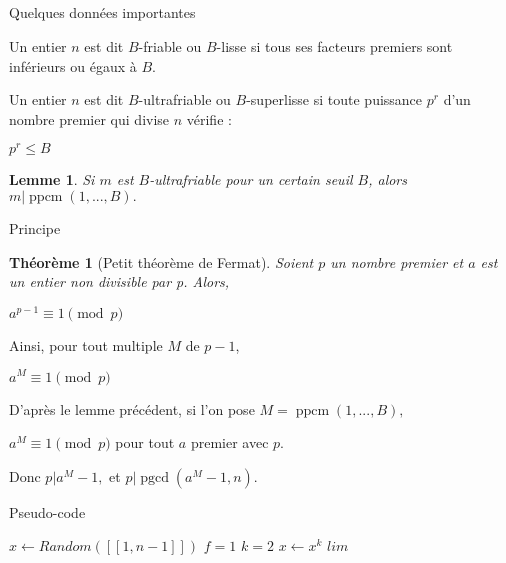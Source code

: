 \documentclass[utf8,10pt,french]{beamer}
\newtheorem{theoreme}{Th{\'e}or{\`e}me}
\newtheorem{lemme}{Lemme}
\DeclareMathOperator{\pgcd}{pgcd}
\DeclareMathOperator{\ppcm}{ppcm}
\begin{document}
\subsection{}
\begin{frame}{Quelques données importantes}
\begin{definition}
Un entier $n$ est dit $B$-friable ou $B$-lisse si tous ses facteurs premiers sont inférieurs ou égaux à $B.$
\end{definition} \pause

\begin{definition}
Un entier $n$ est dit $B$-ultrafriable ou $B$-superlisse si toute puissance $p^r$ d’un nombre premier qui divise $n$ vérifie :
\begin{center}
$p^r \leq B$
\end{center}
\end{definition} \pause

\begin{lemme}
Si $m$ est $B$-ultrafriable pour un certain seuil $B$, alors $m | \ppcm(1, ..., B).$
\end{lemme}
\end{frame}

\begin{frame}{Principe}
\begin{theoreme}[Petit théorème de Fermat]
Soient $p$ un nombre premier et $a$ est un entier non divisible par p. Alors,
\begin{center}  
$a^{p - 1} \equiv 1 \pmod p$
\end{center}
\end{theoreme} \pause
Ainsi, pour tout multiple $M$ de $p - 1$,
\begin{center}
$a^M \equiv 1 \pmod p$
\end{center} \pause
D'après le lemme précédent, si l'on pose $M = \ppcm(1, ..., B),$
\begin{center}
$a^M \equiv 1 \pmod p$ pour tout $a$ premier avec $p.$
\end{center} \pause
Donc $p | a^M - 1,$ et $p | \pgcd(a^M - 1, n).$
\end{frame}

\begin{frame}{Pseudo-code}
\begin{algorithm}[H]
\caption{Factorisation de $n$ par $p-1$ de Pollard}
\BlankLine
$x \gets Random([\![1,n-1]\!])$\;
$f = 1$\;
$k = 2$\;
$x \gets x^k$\;
$lim$\;
\end{algorithm}
\end{frame}
\end{document}
